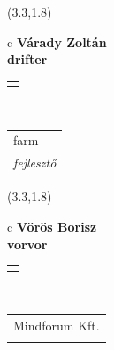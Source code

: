 \documentclass[11pt]{article}
\begin{document}
\makebox(3.3,1.8){
  \renewcommand\arraystretch{1.3}
  \begin{tabular}[c]{c}
    \hspace{8.5mm}
    \LARGE\bf{ Várady Zoltán }\\
    \hspace{8.5mm}
    \Large{ drifter }\\
    \renewcommand\arraystretch{3}
    \begin{tabular}[c]{c}
      \centering
      \fontfamily{phv}\selectfont{
        \textbf{
          \textsc{
            \scriptsize{
            \color{Bright}{ Ismerkedő }\color{Bright}{ Webmester }\color{Bright}{ Sminkmester }\color{Dark}{ Programozó }
            }
          }
        }
      }
    \end{tabular}
    \\
    \renewcommand\arraystretch{1}
    \begin{tabular}{p{3.3in}}
      \hspace{.7cm}farm\\
      \hspace{.7cm}\emph{ fejlesztő }\\
    \end{tabular}
  \end{tabular}
}

\makebox(3.3,1.8){
  \renewcommand\arraystretch{1.3}
  \begin{tabular}[c]{c}
    \hspace{8.5mm}
    \LARGE\bf{ Vörös Borisz }\\
    \hspace{8.5mm}
    \Large{ vorvor }\\
    \renewcommand\arraystretch{3}
    \begin{tabular}[c]{c}
      \centering
      \fontfamily{phv}\selectfont{
        \textbf{
          \textsc{
            \scriptsize{
            \color{Bright}{ Ismerkedő }\color{Bright}{ Webmester }\color{Bright}{ Sminkmester }\color{Dark}{ Programozó }
            }
          }
        }
      }
    \end{tabular}
    \\
    \renewcommand\arraystretch{1}
    \begin{tabular}{p{3.3in}}
      \hspace{.7cm}Mindforum Kft.\\
      \hspace{.7cm}\emph{  }\\
    \end{tabular}
  \end{tabular}
}
\end{document}
